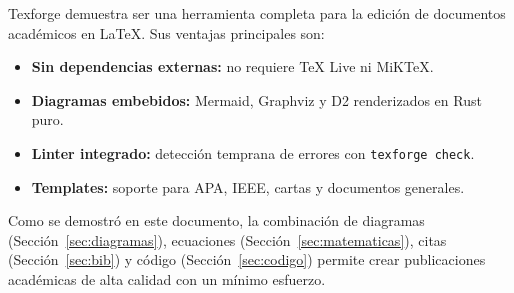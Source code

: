 \documentclass[a4paper,12pt]{article}
\begin{document}
  Texforge demuestra ser una herramienta completa para la edición de
  documentos académicos en \LaTeX{}. Sus ventajas principales son:

  \begin{itemize}
    \item \textbf{Sin dependencias externas:} no requiere TeX Live ni MiKTeX.
    \item \textbf{Diagramas embebidos:} Mermaid, Graphviz y D2 renderizados en Rust puro.
    \item \textbf{Linter integrado:} detección temprana de errores con \texttt{texforge check}.
    \item \textbf{Templates:} soporte para APA, IEEE, cartas y documentos generales.
  \end{itemize}

  Como se demostró en este documento, la combinación de diagramas
  (Sección~\ref{sec:diagramas}), ecuaciones (Sección~\ref{sec:matematicas}),
  citas (Sección~\ref{sec:bib}) y código (Sección~\ref{sec:codigo}) permite
  crear publicaciones académicas de alta calidad con un mínimo esfuerzo.

  
  
\end{document}
